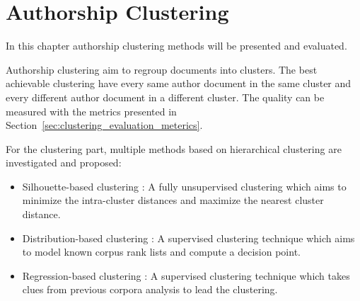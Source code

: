 \section{Authorship Clustering \label{sec:clustering}}

In this chapter authorship clustering methods will be presented and evaluated.

Authorship clustering aim to regroup documents into clusters.
The best achievable clustering have every same author document in the same cluster and every different author document in a different cluster.
The quality can be measured with the metrics presented in Section~\ref{sec:clustering_evaluation_meterics}.

For the clustering part, multiple methods based on hierarchical clustering are investigated and proposed:
\begin{itemize}
  \item
  Silhouette-based clustering : A fully unsupervised clustering which aims to minimize the intra-cluster distances and maximize the nearest cluster distance.
  \item
  Distribution-based clustering : A supervised clustering technique which aims to model known corpus rank lists and compute a decision point.
  \item
  Regression-based clustering : A supervised clustering technique which takes clues from previous corpora analysis to lead the clustering.
\end{itemize}






